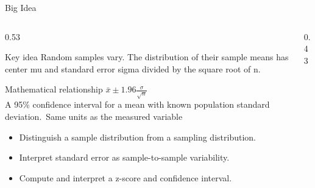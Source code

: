 \documentclass[aspectratio=169]{beamer}
\begin{document}
\begin{frame}{Big Idea}
\begin{columns}[T]
\begin{column}{0.53\textwidth}
\begin{alertblock}{Key idea}
\small Random samples vary. The distribution of their sample means has center mu and standard error sigma divided by the square root of n.
\end{alertblock}

\begin{block}{Mathematical relationship}
\centering\Large $\bar{x}\pm1.96\frac{\sigma}{\sqrt{n}}$\\[0.12cm]
\small A 95\% confidence interval for a mean with known population standard deviation.\ Same units as the measured variable
\end{block}

\begin{itemize}
\small
\item Distinguish a sample distribution from a sampling distribution.
\item Interpret standard error as sample-to-sample variability.
\item Compute and interpret a z-score and confidence interval.
\end{itemize}
\end{column}
\begin{column}{0.43\textwidth}
\begin{center}\end{center}
\end{column}
\end{columns}

\end{frame}
\end{document}
